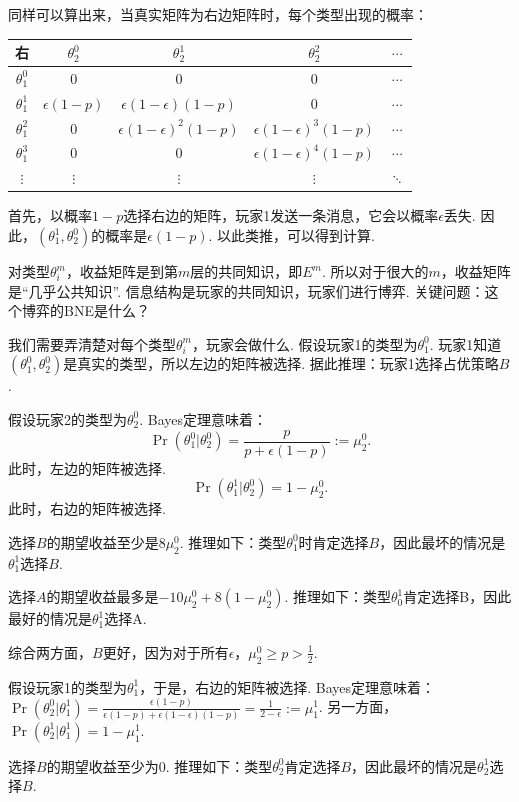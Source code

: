 同样可以算出来，当真实矩阵为右边矩阵时，每个类型出现的概率：
\begin{table}[ht]
    \centering
\begin{tabular}{c|cccc}
右& $\theta_2^0$ & $\theta_2^1$ & $\theta_2^2$ & $\cdots$ \\
\hline
$\theta_1^0$ & $0$ & $0$ & $0$ & $\cdots$ \\
$\theta_1^1$ & $\epsilon(1 - p)$ & $\epsilon(1 - \epsilon)(1 - p)$ & $0$ & $\cdots$ \\
$\theta_1^2$ & $0$ & $\epsilon(1 - \epsilon)^2(1 - p)$ & $\epsilon(1 - \epsilon)^3(1 - p)$ & $\cdots$ \\
$\theta_1^3$ & $0$ & $0$ & $\epsilon(1 - \epsilon)^4(1 - p)$ & $\cdots$ \\
$\vdots$ & $\vdots$ & $\vdots$ & $\vdots$ & $\ddots$
\end{tabular}
\end{table}
首先，以概率$1 - p$选择右边的矩阵，玩家1发送一条消息，它会以概率$\epsilon$丢失. 因此，$(\theta_1^1,\theta_2^0)$的概率是$\epsilon(1 - p)$. 以此类推，可以得到计算. 

对类型$\theta_i^m$，收益矩阵是到第$m$层的共同知识，即$E^m$. 所以对于很大的$m$，收益矩阵是“几乎公共知识”. 信息结构是玩家的共同知识，玩家们进行博弈. 关键问题：这个博弈的BNE是什么？

我们需要弄清楚对每个类型$\theta_i^m$，玩家会做什么. 假设玩家1的类型为$\theta_1^0$. 玩家1知道$(\theta_1^0,\theta_2^0)$是真实的类型，所以左边的矩阵被选择. 据此推理：玩家1选择占优策略$B$.

假设玩家2的类型为$\theta_2^0$. Bayes定理意味着：
\[\Pr(\theta_1^0|\theta_2^0) = \frac{p}{p+\epsilon(1-p)} := \mu_2^0.\] 
此时，左边的矩阵被选择. 
\[\Pr(\theta_1^1|\theta_2^0) = 1 - \mu_2^0.\] 
此时，右边的矩阵被选择. 

选择$B$的期望收益至少是$8\mu_2^0$. 推理如下：类型$\theta_1^0$时肯定选择$B$，因此最坏的情况是$\theta_1^1$选择$B$.

选择$A$的期望收益最多是$-10\mu_2^0 + 8(1 - \mu_2^0)$. 推理如下：类型$\theta_0^1$肯定选择B，因此最好的情况是$\theta_1^1$选择A. 

综合两方面，$B$更好，因为对于所有$\epsilon$，$\mu_2^0 \geq p > \frac{1}{2}$.

假设玩家1的类型为$\theta_1^1$，于是，右边的矩阵被选择. Bayes定理意味着：$\Pr(\theta_2^0|\theta_1^1) = \frac{\epsilon(1-p)}{\epsilon(1-p)+\epsilon(1-\epsilon)(1-p)} = \frac{1}{2-\epsilon} := \mu_1^1$. 另一方面，$\Pr(\theta_2^1|\theta_1^1) = 1 - \mu_1^1$. 

选择$B$的期望收益至少为$0$. 推理如下：类型$\theta_2^0$肯定选择$B$，因此最坏的情况是$\theta_2^1$选择$B$. 

